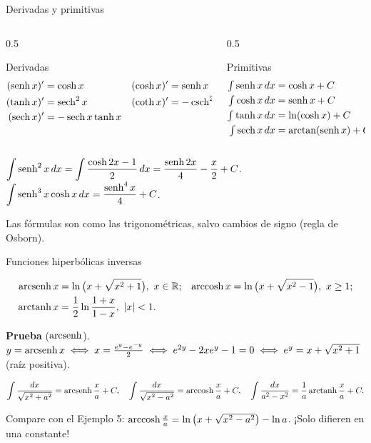 \documentclass[10pt,aspectratio=169]{beamer}
\begin{document}
\begin{frame}{Derivadas y primitivas}
  \begin{columns}[t]
    \begin{column}{0.5\textwidth}
      \begin{block}{Derivadas}
        \begin{align*}
          (\operatorname{senh} x)'&=\cosh x & (\cosh x)'&=\operatorname{senh} x\\
          (\tanh x)'&=\operatorname{sech}^2x & (\coth x)'&=-\operatorname{csch}^2x\\
          (\operatorname{sech} x)'&=-\operatorname{sech} x\tanh x
        \end{align*}
        \vspace{-4mm}
      \end{block}
    \end{column}
    \begin{column}{0.5\textwidth}
      \begin{block}{Primitivas}
        \begin{align*}
          \textstyle\int\operatorname{senh} x\,dx&=\cosh x+C\\
          \textstyle\int\cosh x\,dx&=\operatorname{senh} x+C\\
          \textstyle\int\tanh x\,dx&=\ln(\cosh x)+C\\
          \textstyle\int\operatorname{sech} x\,dx&=\arctan(\operatorname{senh} x)+C
        \end{align*}
        \vspace{-4mm}
      \end{block}
    \end{column}
  \end{columns}
  \begin{ejemplo}
    $\displaystyle\int\operatorname{senh}^2x\,dx=\int\frac{\cosh2x-1}{2}\,dx=\frac{\operatorname{senh}2x}{4}-\frac x2+C$. \quad
    $\displaystyle\int\operatorname{senh}^3x\cosh x\,dx=\frac{\operatorname{senh}^4x}{4}+C$.
  \end{ejemplo}
  \small Las fórmulas son como las trigonométricas, salvo cambios de signo (regla de Osborn).
\end{frame}

\begin{frame}{Funciones hiperbólicas inversas}
  \begin{proposicion}
    \begin{align*}
      \operatorname{arcsenh} x&=\ln\big(x+\sqrt{x^2+1}\big),\ x\in\mathbb{R}; &
      \operatorname{arccosh} x&=\ln\big(x+\sqrt{x^2-1}\big),\ x\ge1;\\
      \operatorname{arctanh} x&=\frac12\ln\frac{1+x}{1-x},\ |x|<1.
    \end{align*}
  \end{proposicion}
  \textbf{Prueba} ($\operatorname{arcsenh}$). $y=\operatorname{arcsenh} x\iff x=\frac{e^y-e^{-y}}{2}\iff e^{2y}-2xe^y-1=0\iff e^y=x+\sqrt{x^2+1}$ (raíz positiva).
  \begin{teorema}
    \[ \int\frac{dx}{\sqrt{x^2+a^2}}=\operatorname{arcsenh}\frac xa+C,\quad \int\frac{dx}{\sqrt{x^2-a^2}}=\operatorname{arccosh}\frac xa+C,\quad
       \int\frac{dx}{a^2-x^2}=\frac1a\operatorname{arctanh}\frac xa+C. \]
  \end{teorema}
  \small Compare con el Ejemplo 5: $\operatorname{arccosh}\frac xa=\ln\big(x+\sqrt{x^2-a^2}\big)-\ln a$. ¡Solo difieren en una constante!
\end{frame}
\end{document}
